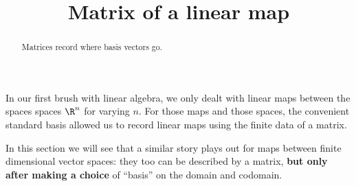 \documentclass{ximera}
\title{Matrix of a linear map}
\begin{document}
\begin{abstract}
  Matrices record where basis vectors go.
\end{abstract}\maketitle

In our first brush with linear algebra, we only dealt with linear maps
between the spaces spaces $\R^n$ for varying $n$.  For those maps and
those spaces, the convenient standard basis allowed us to record
linear maps using the finite data of a matrix.

In this section we will see that a similar story plays out for maps
between finite dimensional vector spaces: they too can be described by
a matrix, \textbf{but only after making a choice} of ``basis'' on the
domain and codomain.
\end{document}
